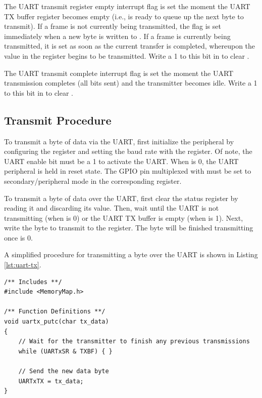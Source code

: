 The UART transmit register empty interrupt flag  is set the moment the UART TX buffer register  becomes empty (i.e., is ready to queue up the next byte to transmit). If a frame is not currently being transmitted, the flag is set immediately when a new byte is written to . If a frame is currently being transmitted, it is set as soon as the current transfer is completed, whereupon the value in the  register begins to be transmitted. Write a 1 to this bit in  to clear .

The UART transmit complete interrupt flag  is set the moment the UART transmission completes (all bits sent) and the transmitter becomes idle. Write a 1 to this bit in  to clear .



\subsection{Transmit Procedure}

To transmit a byte of data via the UART, first initialize the  peripheral by configuring the  register and setting the baud rate with the  register. Of note, the UART enable bit  must be a 1 to activate the UART. When  is 0, the UART peripheral is held in reset state. The GPIO pin multiplexed with  must be set to secondary/peripheral mode in the corresponding  register.

To transmit a byte of data over the UART, first clear the status register by reading it and discarding its value. Then, wait until the UART is not transmitting (when  is 0) or the UART TX buffer is empty (when  is 1). Next, write the byte to transmit to the  register. The byte will be finished transmitting once  is 0.

A simplified procedure for transmitting a byte over the UART is shown in Listing \ref{lst:uart-tx}.

\begin{lstlisting}[style=customC, label=lst:uart-tx, caption={Example Function for UART Transmissions}]
/** Includes **/
#include <MemoryMap.h>

/** Function Definitions **/
void uartx_putc(char tx_data)
{
	// Wait for the transmitter to finish any previous transmissions
	while (UARTxSR & TXBF) { }
	
	// Send the new data byte
	UARTxTX = tx_data;
}
\end{lstlisting}



